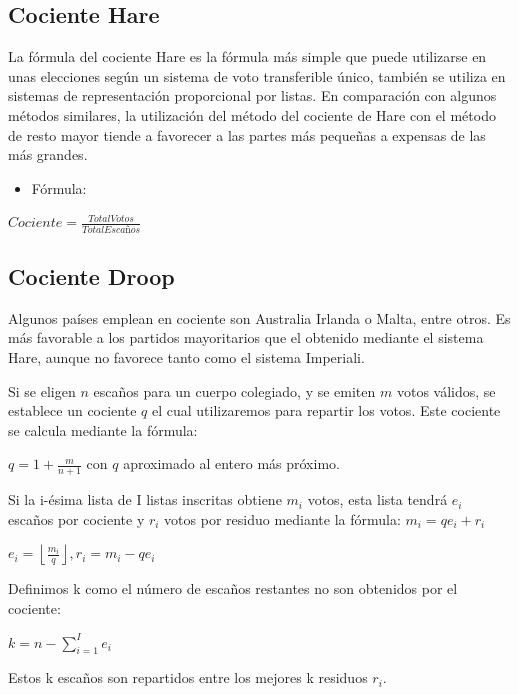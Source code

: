 \documentclass[12pt,a4paper,]{book}
\providecommand{\tightlist}{%
  \setlength{\itemsep}{0pt}\setlength{\parskip}{0pt}}
\numberwithin{dummy}{section}
\theoremstyle{ocrenumbox}
\theoremstyle{blacknumex}
\theoremstyle{blacknumbox}
\theoremstyle{ocrenum}
\theoremstyle{ocrenum}
\begin{document}
\hypertarget{cociente-hare}{%
\subsection{Cociente Hare}\label{cociente-hare}}

La fórmula del cociente Hare es la fórmula más simple que puede
utilizarse en unas elecciones según un sistema de voto transferible
único, también se utiliza en sistemas de representación proporcional por
listas. En comparación con algunos métodos similares, la utilización del
método del cociente de Hare con el método de resto mayor tiende a
favorecer a las partes más pequeñas a expensas de las más grandes.

\begin{itemize}
\tightlist
\item
  Fórmula:
\end{itemize}

\(Cociente = \frac{Total Votos}{Total Escaños}\)

\hypertarget{cociente-droop}{%
\subsection{Cociente Droop}\label{cociente-droop}}

Algunos países emplean en cociente son Australia Irlanda o Malta, entre
otros. Es más favorable a los partidos mayoritarios que el obtenido
mediante el sistema Hare, aunque no favorece tanto como el sistema
Imperiali.

Si se eligen \({n}\) escaños para un cuerpo colegiado, y se emiten
\({m}\) votos válidos, se establece un cociente \({q}\) el cual
utilizaremos para repartir los votos. Este cociente se calcula mediante
la fórmula:

\({q=1+{\frac {m}{n+1}}}\) con \(q\) aproximado al entero más próximo.

Si la i-ésima lista de I listas inscritas obtiene \({m_{i}}\) votos,
esta lista tendrá \({e_{i}}\) escaños por cociente y \({r_{i}}\) votos
por residuo mediante la fórmula: \({m_{i}=qe_{i}+r_{i}}\)

\({e_{i}=\left\lfloor {\frac {m_{i}}{q}}\right\rfloor ,r_{i}=m_{i}-qe_{i}}\)

Definimos k como el número de escaños restantes no son obtenidos por el
cociente:

\({k=n-\sum _{i=1}^{I}e_{i}}\)

Estos k escaños son repartidos entre los mejores k residuos \({r_{i}}\).
\end{document}
